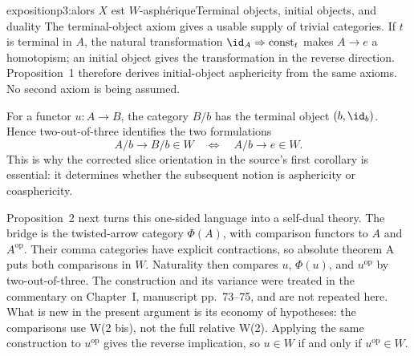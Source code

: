 \begin{dcomment}{exposition}{p3:alors $X$ est $W$-asphérique}{Terminal objects, initial objects, and duality}
The terminal-object axiom gives a usable supply of trivial categories. If \(t\) is terminal in \(A\), the natural transformation \(\id_A\Rightarrow \operatorname{const}_t\) makes \(A\to e\) a homotopism; an initial object gives the transformation in the reverse direction. Proposition~1 therefore derives initial-object asphericity from the same axioms. No second axiom is being assumed.

For a functor \(u:A\to B\), the category \(B/b\) has the terminal object \((b,\id_b)\). Hence two-out-of-three identifies the two formulations
\[
 A/b\longrightarrow B/b\in W
 \quad\Longleftrightarrow\quad A/b\longrightarrow e\in W .
\]
This is why the corrected slice orientation in the source's first corollary is essential: it determines whether the subsequent notion is asphericity or coasphericity.

Proposition~2 next turns this one-sided language into a self-dual theory. The bridge is the twisted-arrow category \(\Phi(A)\), with comparison functors to \(A\) and \(A^{\mathrm{op}}\). Their comma categories have explicit contractions, so absolute theorem A puts both comparisons in \(W\). Naturality then compares \(u\), \(\Phi(u)\), and \(u^{\mathrm{op}}\) by two-out-of-three. The construction and its variance were treated in the commentary on Chapter~I, manuscript pp.~73--75, and are not repeated here. What is new in the present argument is its economy of hypotheses: the comparisons use W(2 bis), not the full relative W(2). Applying the same construction to \(u^{\mathrm{op}}\) gives the reverse implication, so \(u\in W\) if and only if \(u^{\mathrm{op}}\in W\).
\end{dcomment}

